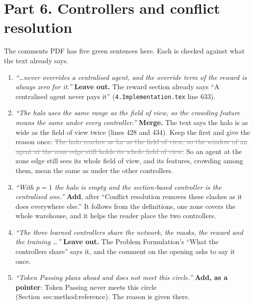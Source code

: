\documentclass[11pt,a4paper]{article}
\newcommand{\new}[1]{\textcolor{newc}{#1}}
\newcommand{\old}[1]{\textcolor{gray}{\sout{#1}}}
\newcommand{\lab}[1]{\textsf{\footnotesize #1}}
\renewcommand{\ref}[1]{\lab{#1}}
\begin{document}
\section*{Part 6. Controllers and conflict resolution}
The comments PDF has five green sentences here. Each is checked against
what the text already says.
\begin{enumerate}[label=\alph*)]
  \item \emph{``\dots never overrides a centralised agent, and the override
    term of the reward is always zero for it.''} \textbf{Leave out.} The
    reward section already says ``A centralised agent never pays it''
    (\texttt{4.Implementation.tex} line 633).
  \item \emph{``The halo uses the same range as the field of view, so the
    crowding feature means the same under every controller.''}
    \textbf{Merge.} The text says the halo is as wide as the field of view
    twice (lines 428 and 434). Keep the first and give the reason once:
    \old{The halo reaches as far as the field of view, so the window of an
    agent at the zone edge still holds its whole field of view.} \new{So an
    agent at the zone edge still sees its whole field of view, and its
    features, crowding among them, mean the same as under the other
    controllers.}
  \item \emph{``With $p=1$ the halo is empty and the section-based controller
    is the centralised one.''} \textbf{Add}, after ``Conflict resolution
    removes these clashes as it does everywhere else.'' It follows from the
    definitions, one zone covers the whole warehouse, and it helps the
    reader place the two controllers.
  \item \emph{``The three learned controllers share the network, the masks,
    the reward and the training \dots''} \textbf{Leave out.} The Problem
    Formulation's ``What the controllers share'' says it, and the comment
    on the opening asks to say it once.
  \item \emph{``Token Passing plans ahead and does not meet this circle.''}
    \textbf{Add, as a pointer}: \new{Token Passing never meets this circle
    (Section~\ref{sec:method:reference}).} The reason is given there.
\end{enumerate}
\end{document}
